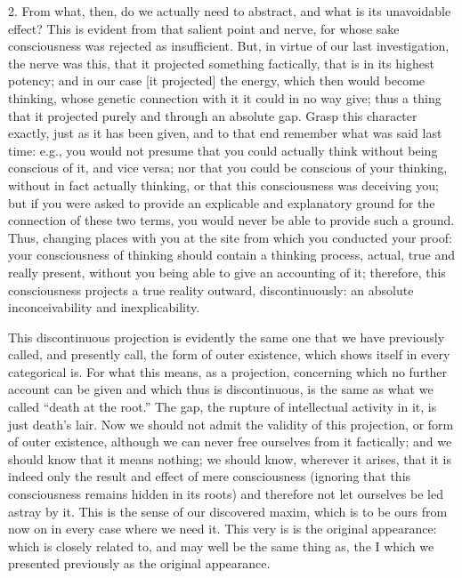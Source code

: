 2. From what, then, do we actually need to abstract,
and what is its unavoidable effect?
This is evident from that salient point and nerve,
for whose sake consciousness was rejected as insufficient.
But, in virtue of our last investigation, the nerve was this,
that it projected something factically,
that is in its highest potency;
and in our case [it projected] the energy,
which then would become thinking,
whose genetic connection with it
it could in no way give;
thus a thing that it projected
purely and through an absolute gap.
Grasp this character exactly,
just as it has been given, and
to that end remember what was said last time:
e.g., you would not presume
that you could actually think
without being conscious of it,
and vice versa;
nor that you could be conscious of your thinking,
without in fact actually thinking,
or that this consciousness was deceiving you;
but if you were asked to provide
an explicable and explanatory ground
for the connection of these two terms,
you would never be able to provide such a ground.
Thus, changing places with you at the site
from which you conducted your proof:
your consciousness of thinking should
contain a thinking process,
actual, true and really present,
without you being able to give an accounting of it;
therefore, this consciousness projects
a true reality outward, discontinuously:
an absolute inconceivability and inexplicability.

This discontinuous projection is evidently
the same one that we have previously called,
and presently call, the form of outer existence,
which shows itself in every categorical is.
For what this means, as a projection,
concerning which no further account can be given
and which thus is discontinuous,
is the same as what we called “death at the root.”
The gap, the rupture of intellectual activity in it,
is just death's lair.
Now we should not admit the validity of this projection,
or form of outer existence,
although we can never free ourselves from it factically;
and we should know that it means nothing;
we should know, wherever it arises,
that it is indeed only the result
and effect of mere consciousness
(ignoring that this consciousness
remains hidden in its roots)
and therefore not let ourselves
be led astray by it.
This is the sense of our discovered maxim,
which is to be ours from now on in every case
where we need it.
This very is is the original appearance:
which is closely related to,
and may well be the same thing as,
the I which we presented previously
as the original appearance.

